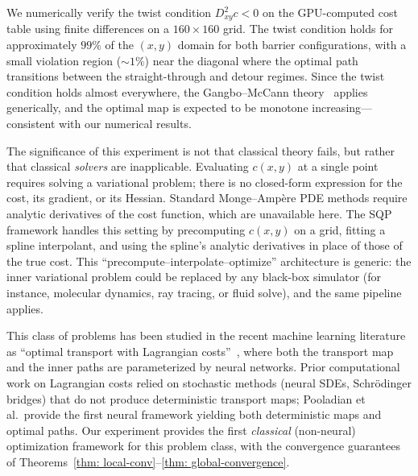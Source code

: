 \documentclass[12pt,leqno]{amsart}
\newcounter{experiment}
\begin{document}
We numerically verify the twist condition $D^2_{xy}c < 0$  on the GPU-computed cost table using finite differences on a $160 \times 160$ grid.  The twist condition holds for approximately $99\%$ of the $(x,y)$ domain for both barrier configurations, with a small violation region (${\sim}1\%$) near the diagonal where the optimal path transitions between the straight-through and detour regimes.  Since the twist condition holds almost everywhere, the Gangbo--McCann theory~\citep{GangboMcCann1996} applies generically, and the optimal map is expected to be monotone increasing---consistent with our numerical results.

The significance of this experiment is not that classical theory fails, but rather that classical \emph{solvers} are inapplicable.  Evaluating $c(x,y)$ at a single point requires solving a variational problem; there is no closed-form expression for the cost, its gradient, or its Hessian.  Standard Monge--Amp\`ere PDE methods require analytic derivatives of the cost function, which are unavailable here.  The SQP framework handles this setting by precomputing $c(x,y)$ on a grid, fitting a spline interpolant, and using the spline's analytic derivatives in place of those of the true cost.  This ``precompute--interpolate--optimize'' architecture is generic: the inner variational problem could be replaced by any black-box simulator (for instance, molecular dynamics, ray tracing, or fluid solve), and the same pipeline applies.

This class of problems has been studied in the recent machine learning literature as ``optimal transport with Lagrangian costs''~\citep{pooladian2024neural}, where both the transport map and the inner paths are parameterized by neural networks.  Prior computational work on Lagrangian costs relied on stochastic methods (neural SDEs, Schr\"odinger bridges) that do not produce deterministic transport maps; Pooladian et al.\ provide the first neural framework yielding both deterministic maps and optimal paths.  Our experiment provides the first \emph{classical} (non-neural) optimization framework for this problem class, with the convergence guarantees of Theorems~\ref{thm: local-conv}--\ref{thm: global-convergence}.
\end{document}
